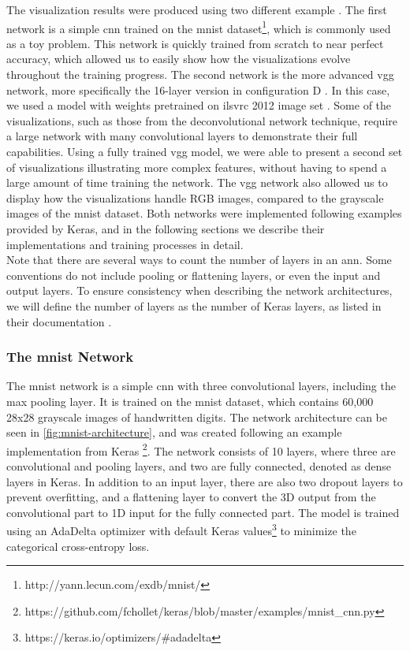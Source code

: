 The visualization results were produced using two different example . The first network is a simple \acrshort{cnn} trained on the \acrfull{mnist} dataset\footnote{http://yann.lecun.com/exdb/mnist/}, which is commonly used as a toy problem. This network is quickly trained from scratch to near perfect accuracy, which allowed us to easily show how the visualizations evolve throughout the training progress. The second network is the more advanced \acrshort{vgg} network, more specifically the 16-layer version in configuration D \cite{vgg}. In this case, we used a model with weights pretrained on \acrshort{ilsvrc} 2012 image set \cite{imagenet}. Some of the visualizations, such as those from the deconvolutional network technique, require a large network with many convolutional layers to demonstrate their full capabilities. Using a fully trained \acrshort{vgg} model, we were able to present a second set of visualizations illustrating more complex features, without having to spend a large amount of time training the network. The \acrshort{vgg} network also allowed us to display how the visualizations handle RGB images, compared to the grayscale images of the \acrshort{mnist} dataset. Both networks were implemented following examples provided by Keras, and in the following sections we describe their implementations and training processes in detail.\\

\noindent Note that there are several ways to count the number of layers in an \acrshort{ann}. Some conventions do not include pooling or flattening layers, or even the input and output layers. To ensure consistency when describing the network architectures, we will define the number of layers as the number of Keras layers, as listed in their documentation \cite{keras-documentation}.

\subsubsection{The \acrshort{mnist} Network}

The \acrshort{mnist} network is a simple \acrshort{cnn} with three convolutional layers, including the max pooling layer. It is trained on the \acrshort{mnist} dataset, which contains 60,000 28x28 grayscale images of handwritten digits. The network architecture can be seen in \autoref{fig:mnist-architecture}, and was created following an example implementation from Keras \footnote{https://github.com/fchollet/keras/blob/master/examples/mnist\_cnn.py}. The network consists of 10 layers, where three are convolutional and pooling layers, and two are fully connected, denoted as dense layers in Keras. In addition to an input layer, there are also two dropout layers to prevent overfitting, and a flattening layer to convert the 3D output from the convolutional part to 1D input for the fully connected part. The model is trained using an AdaDelta optimizer with default Keras values\footnote{https://keras.io/optimizers/\#adadelta} to minimize the categorical cross-entropy loss. \\

